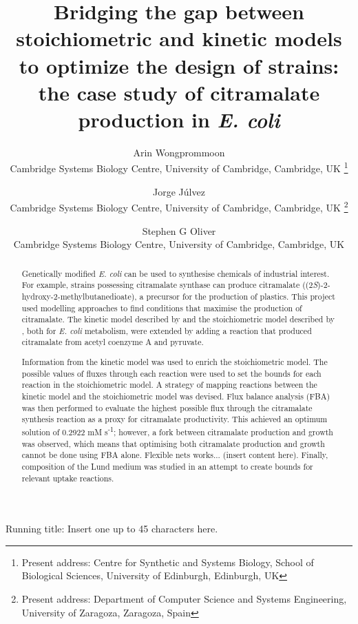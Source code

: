 \documentclass[a4paper, 12pt]{scrartcl}
\begin{document}
  \title{Bridging the gap between stoichiometric and kinetic models to optimize the design of strains: the case study of citramalate production in \emph{E. coli}}

  \author{
    Arin Wongprommoon\\
    {\small Cambridge Systems Biology Centre, University of Cambridge, Cambridge, UK \thanks{
      Present address: Centre for Synthetic and Systems Biology, School of Biological Sciences, University of Edinburgh, Edinburgh, UK} } \and
    Jorge J\'ulvez \\
    {\small Cambridge Systems Biology Centre, University of Cambridge, Cambridge, UK \thanks{
      Present address: Department of Computer Science and Systems Engineering, University of Zaragoza, Zaragoza, Spain} } \and
    Stephen G Oliver\\
    {\small Cambridge Systems Biology Centre, University of Cambridge, Cambridge, UK }}

  \maketitle

  Running title: Insert one up to 45 characters here.

  \pagebreak

  \doublespacing
  
  \begin{abstract}

Genetically modified \emph{E. coli} can be used to synthesise chemicals of industrial interest. For example, strains possessing citramalate synthase can produce citramalate ((2\emph{S})-2-hydroxy-2-methylbutanedioate), a precursor for the production of plastics.
  This project used modelling approaches to find conditions that maximise the production of citramalate. The kinetic model described by \citet{millard_metabolic_2017} and the stoichiometric model described by \citet{orth_comprehensive_2011}, both for \emph{E. coli} metabolism, were extended by adding a reaction that produced citramalate from acetyl coenzyme A and pyruvate.
  
  Information from the kinetic model was used to enrich the stoichiometric model. The possible values of fluxes through each reaction were used to set the bounds for each reaction in the stoichiometric model. A strategy of mapping reactions between the kinetic model and the stoichiometric model was devised. Flux balance analysis (FBA) was then performed to evaluate the highest possible flux through the citramalate synthesis reaction as a proxy for citramalate productivity. This achieved an optimum solution of 0.2922 mM s\textsuperscript{-1}; however, a fork between citramalate production and growth was observed, which means that optimising both citramalate production and growth cannot be done using FBA alone. Flexible nets works... (insert content here).  Finally, composition of the Lund medium \citep{eastham_process_2015} was studied in an attempt to create bounds for relevant uptake reactions.

  \end{abstract}
\end{document}
